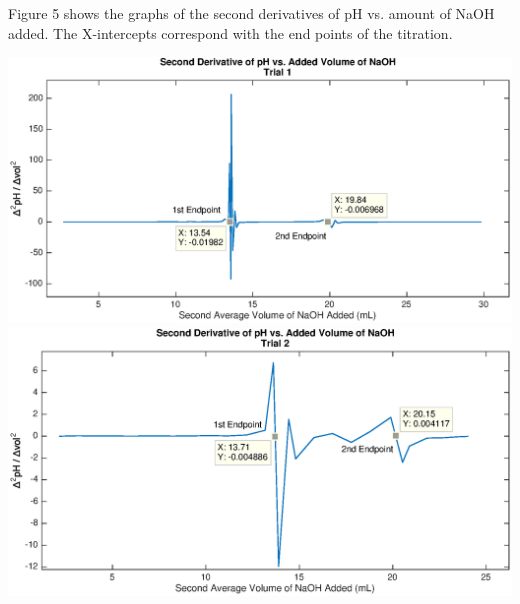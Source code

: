 \documentclass{article}
\begin{document}
Figure 5 shows the graphs of the second derivatives of pH vs. amount of NaOH
added. The X-intercepts correspond with the end points of the titration.
\begin{center}
        \includegraphics[scale=0.7]{2dev_1}
        \includegraphics[scale=0.7]{2dev_2}
\end{center}
\newpage
\end{document}
